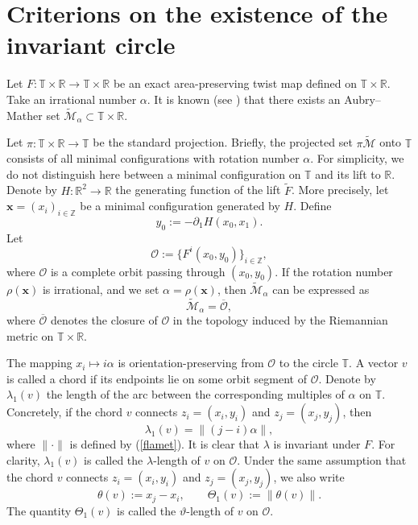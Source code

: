 \documentclass{amsart}
\theoremstyle{definition}
\begin{document}
\section{Criterions on the existence of the invariant circle }\label{S3}


Let \( F:\mathbb{T}\times\mathbb{R}\to\mathbb{T}\times\mathbb{R} \) be  an exact area-preserving twist map defined on \( \mathbb{T}\times\mathbb{R} \).  Take an irrational number \( \alpha \). It is known (see \cite{B,FoM}) that there exists an Aubry--Mather set \( \widetilde{\mathcal{M}}_{\alpha}\subset \mathbb{T}\times\mathbb{R} \).

Let $\pi:\mathbb{T}\times\mathbb{R}\to\mathbb{T}$ be the standard projection. Briefly, the projected set $\pi \widetilde{\mathcal{M}}$ onto \( \mathbb{T} \)  consists of all minimal configurations with rotation number \( \alpha \). For simplicity, we do not distinguish here between a minimal configuration on \(\mathbb{T}\) and its lift to \(\mathbb{R}\). Denote by \( H:\mathbb{R}^2\to\mathbb{R} \) the generating function of the lift \( \tilde{F} \).
More precisely, let \( \mathbf{x}=(x_i)_{i\in\mathbb{Z}} \) be a minimal configuration generated by \( H \). Define
\[
y_0:=-\partial_1 H(x_0,x_1).
\]
Let
\[
\mathcal{O}:= \{ F^{i}(x_0,y_0)\}_{i\in\mathbb{Z}},
\]
where \( \mathcal{O} \) is a complete orbit passing through \( (x_0,y_0)\).
If the rotation number \( \rho(\mathbf{x}) \) is irrational, and we set \( \alpha=\rho(\mathbf{x}) \), then \( \widetilde{\mathcal{M}}_{\alpha} \) can be expressed as
\[
\widetilde{\mathcal{M}}_{\alpha}= \overline{\mathcal{O}},
\]
where \( \overline{\mathcal{O}} \) denotes the closure of \( \mathcal{O} \) in the topology induced by the Riemannian metric on \( \mathbb{T}\times\mathbb{R} \).


The mapping \( x_i \mapsto i\alpha \) is orientation-preserving from \( \mathcal{O} \) to the circle \( \mathbb{T} \). A vector \( v \) is called a chord if its endpoints lie on some orbit segment of \( \mathcal{O} \). Denote by \( \lambda_1(v) \) the length of the arc between the corresponding multiples of \( \alpha \) on \( \mathbb{T} \). Concretely, if the chord \( v \) connects \( z_i=(x_i,y_i) \) and \( z_j=(x_j,y_j) \), then
\[
\lambda_1(v)=\|(j-i)\alpha\|,
\]
where \( \|\cdot\| \) is defined by (\ref{flamet}). It is clear that \( \lambda \) is invariant under \( F \). For clarity, \( \lambda_1(v) \) is called the \(\lambda\)-length of $v$ on \( \mathcal{O} \).
Under the same assumption that the chord \( v \) connects \( z_i=(x_i,y_i) \) and \( z_j=(x_j,y_j) \), we also write
\[
\theta(v):=x_j-x_i, \qquad \Theta_1(v):=\|\theta(v)\|.
\]
The quantity \( \Theta_1(v) \) is called the \(\vartheta\)-length of $v$ on \( \mathcal{O} \).
\end{document}
